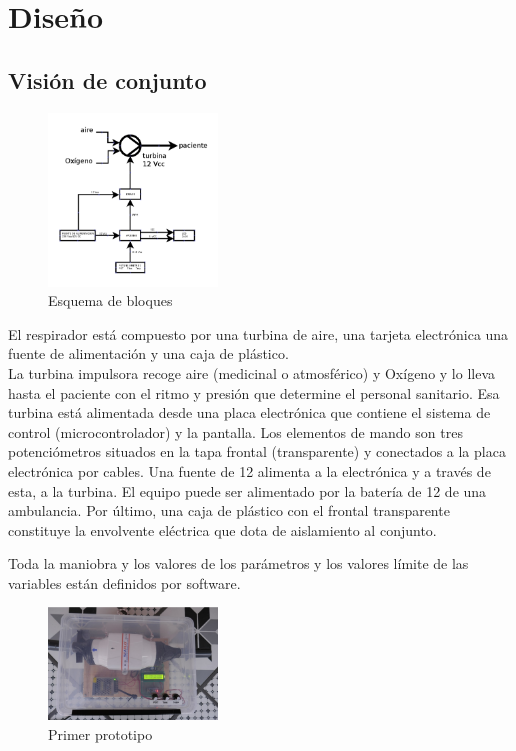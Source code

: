 \section{Diseño}
\subsection{Visión de conjunto}
    \begin{figure}[H]
        \centering
        \includegraphics[width=0.4\textwidth]{Img/Bloques.PNG}
        \caption{Esquema de bloques}
    \end{figure}
    El respirador está compuesto por una turbina de aire, una tarjeta electrónica una fuente de alimentación y una caja de plástico.\\
    
    La turbina impulsora recoge aire (medicinal o atmosférico) y Oxígeno y lo lleva hasta el paciente con el ritmo y presión que determine el personal sanitario. Esa turbina está alimentada desde una placa electrónica que contiene el sistema de control (microcontrolador) y la pantalla. Los elementos de mando son tres potenciómetros situados en la tapa frontal (transparente) y conectados a la placa electrónica por cables. Una fuente de 12 \Vcc alimenta a la electrónica y a través de esta, a la turbina. El equipo puede ser alimentado por la batería de 12 \Vcc de una ambulancia. Por último, una caja de plástico con el frontal transparente constituye la envolvente eléctrica que dota de aislamiento al conjunto.
    
    Toda la maniobra y los valores de los parámetros y los valores límite de las variables están definidos por software.
    \begin{figure}
        \centering
        \includegraphics[width=0.4\textwidth]{Img/prototipo-1.PNG}
        \caption{Primer prototipo}
    \end{figure}
    
